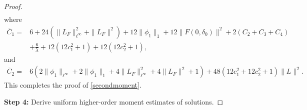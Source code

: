 \documentclass[11pt]{article}
\numberwithin{equation}{section}
\theoremstyle{plain}
\begin{document}
\begin{proof}
\begin{align*}
 \end{align*}
 where
 \begin{align*}
    \bar{C}_1 = & 6 + 24 \left( \|L_{F}\|_{\ell^\infty}^2 + \|L_{F}\|^2 \right)  
                            + 12 \|\phi_1\|_1 + 12 \|F(0,\delta_0)\|^2
                            + 2 \left( C_2 +C_3+C_4
                                  \right)  \\
                        & + \frac{6}{\lambda} 
                            + 12 \left( 12 c_1^2 + 1 \right)
                            + 12 \left( 12 c_2^2 + 1 \right),
 \end{align*}
 and
 \begin{align*}
    \bar{C}_2 = & 6 \left( 2 \|\phi_1\|_{\ell^\infty} 
                                         + 2 \|\phi_1\|_1 
                                         + 4 \|L_{F}\|_{\ell^\infty}^2 
                                         + 4 \|L_{F}\|^2 + 1
                                \right) 
                           + 48 \left( 12 c_1^2 + 12c_2^2 + 1 \right) \|L\|^2.
 \end{align*} 
 This completes the proof of \eqref{secondmoment}. 
 
 {\bf Step 4:} Derive uniform higher-order moment estimates  of solutions. 
 

\end{proof}
\end{document}
